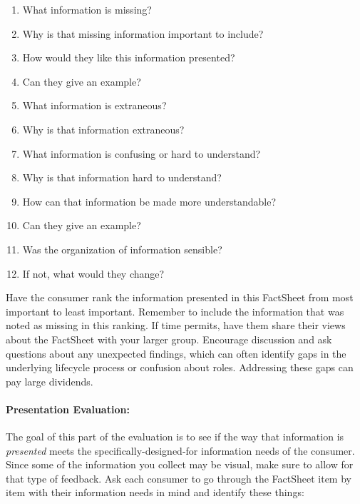 \documentclass[11pt,dvipdfm]{article}
\begin{document}
\begin{enumerate}
    \item What information is missing?
    \item Why is that missing information important to include?
    \item How would they like this information presented?
    \item Can they give an example?
    \item What information is extraneous?
    \item Why is that information extraneous?
    \item What information is confusing or hard to understand?
    \item Why is that information hard to understand?
    \item How can that information be made more understandable?
    \item Can they give an example?
    \item Was the organization of information sensible?
    \item If not, what would they change?
\end{enumerate}
\hspace{.2cm}

Have the consumer rank the information presented in this FactSheet from most important to least important. Remember to include the information that was noted as missing in this ranking. If time permits, have them share their views about the FactSheet with your larger group. Encourage discussion and ask questions about any unexpected findings, which can often identify gaps in the underlying lifecycle process or confusion about roles. Addressing these gaps can pay large dividends.

\paragraph{Presentation Evaluation:} The goal of this part of the evaluation is to see if the way that information is \textit{presented} meets the specifically-designed-for information needs of the consumer. Since some of the information you collect may be visual, make sure to allow for that type of feedback. Ask each consumer to go through the FactSheet item by item with their information needs in mind and identify these things:\\
\end{document}
